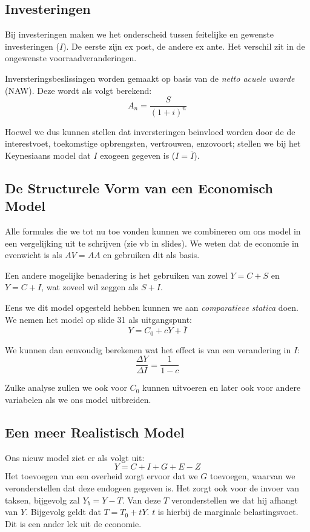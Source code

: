 \subsection{Investeringen}
Bij investeringen maken we het onderscheid tussen feitelijke en gewenste investeringen ($I$). De eerste zijn ex post, de andere ex ante. Het verschil zit in de ongewenste voorraadveranderingen.

Inversteringsbeslissingen worden gemaakt op basis van de \textit{netto acuele waarde} (NAW). Deze wordt als volgt berekend:
\begin{equation}
  A_n = \frac{S}{(1+i)^n}
\end{equation}

Hoewel we dus kunnen stellen dat inversteringen be\"invloed worden door de de interestvoet, toekomstige opbrengsten, vertrouwen, enzovoort; stellen we bij het Keynesiaans model dat $I$ exogeen gegeven is ($I = \overline{I}$).

\subsection{De Structurele Vorm van een Economisch Model}
Alle formules die we tot nu toe vonden kunnen we combineren om ons model in een vergelijking uit te schrijven (zie vb in slides). We weten dat de economie in evenwicht is als $AV = AA$ en gebruiken dit als basis.

Een andere mogelijke benadering is het gebruiken van zowel $Y = C + S$ en $ Y = C + I$, wat zoveel wil zeggen als $S + I$.

Eens we dit model opgesteld hebben kunnen we aan \textit{comparatieve statica} doen. We nemen het model op slide 31 als uitgangspunt:
\begin{equation}
  Y = C_0 + cY + \overline{I}
\end{equation}

We kunnen dan eenvoudig berekenen wat het effect is van een verandering in $I$:
\begin{equation}
  \frac{\Delta Y}{\Delta I} = \frac{1}{1-c}
\end{equation}

Zulke analyse zullen we ook voor $C_0$ kunnen uitvoeren en later ook voor andere variabelen als we ons model uitbreiden.

\subsection{Een meer Realistisch Model}
Ons nieuw model ziet er als volgt uit:
\begin{equation}
  Y = C + I + G + E - Z
\end{equation}
Het toevoegen van een overheid zorgt ervoor dat we $G$ toevoegen, waarvan we veronderstellen dat deze endogeen gegeven is. Het zorgt ook voor de invoer van taksen, bijgevolg zal $Y_b = Y - T$. Van deze $T$ veronderstellen we dat hij afhangt van $Y$. Bijgevolg geldt dat $T = T_0 + tY$. $t$ is hierbij de marginale belastingsvoet. Dit is een ander lek uit de economie.

